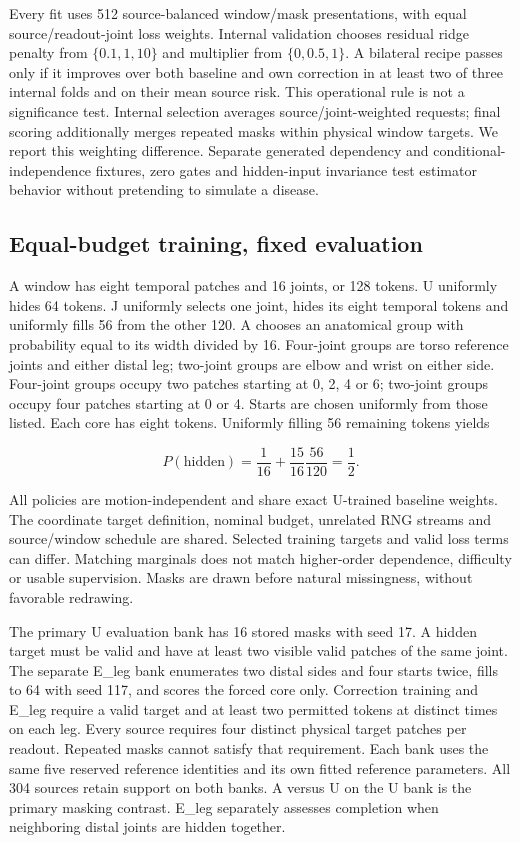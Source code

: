 \documentclass[letterpaper]{article}
\begin{document}
Every fit uses 512 source-balanced window/mask presentations, with equal source/readout-joint loss weights. Internal validation chooses residual ridge penalty from \(\{0.1,1,10\}\) and multiplier from \(\{0,0.5,1\}\). A bilateral recipe passes only if it improves over both baseline and own correction in at least two of three internal folds and on their mean source risk. This operational rule is not a significance test. Internal selection averages source/joint-weighted requests; final scoring additionally merges repeated masks within physical window targets. We report this weighting difference. Separate generated dependency and conditional-independence fixtures, zero gates and hidden-input invariance test estimator behavior without pretending to simulate a disease.

\subsection{Equal-budget training, fixed evaluation}

A window has eight temporal patches and 16 joints, or 128 tokens. U uniformly hides 64 tokens. J uniformly selects one joint, hides its eight temporal tokens and uniformly fills 56 from the other 120. A chooses an anatomical group with probability equal to its width divided by 16. Four-joint groups are torso reference joints and either distal leg; two-joint groups are elbow and wrist on either side. Four-joint groups occupy two patches starting at 0, 2, 4 or 6; two-joint groups occupy four patches starting at 0 or 4. Starts are chosen uniformly from those listed. Each core has eight tokens. Uniformly filling 56 remaining tokens yields

\begin{equation}
P(\text{hidden})=\frac{1}{16}+\frac{15}{16}\frac{56}{120}=\frac12.
\end{equation}

All policies are motion-independent and share exact U-trained baseline weights. The coordinate target definition, nominal budget, unrelated RNG streams and source/window schedule are shared. Selected training targets and valid loss terms can differ. Matching marginals does not match higher-order dependence, difficulty or usable supervision. Masks are drawn before natural missingness, without favorable redrawing.

The primary U evaluation bank has 16 stored masks with seed 17. A hidden target must be valid and have at least two visible valid patches of the same joint. The separate E\_leg bank enumerates two distal sides and four starts twice, fills to 64 with seed 117, and scores the forced core only. Correction training and E\_leg require a valid target and at least two permitted tokens at distinct times on each leg. Every source requires four distinct physical target patches per readout. Repeated masks cannot satisfy that requirement. Each bank uses the same five reserved reference identities and its own fitted reference parameters. All 304 sources retain support on both banks. A versus U on the U bank is the primary masking contrast. E\_leg separately assesses completion when neighboring distal joints are hidden together.
\end{document}
